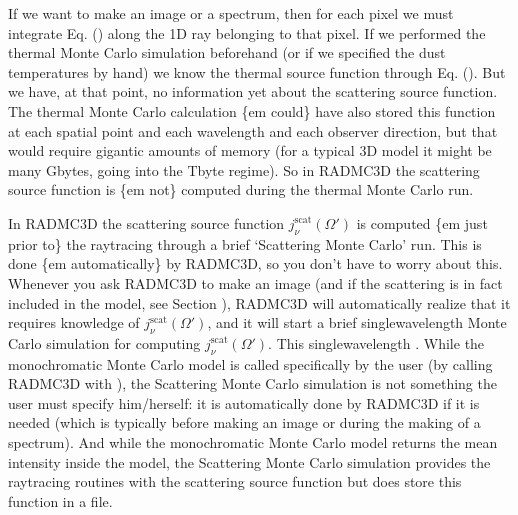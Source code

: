 \documentclass[letterpaper,10pt,english]{sphinxmanual}
\begin{document}
If we want to make an image or a spectrum, then for each pixel we must integrate
Eq. () along the 1\sphinxhyphen{}D ray belonging to that pixel. If we
performed the thermal Monte Carlo simulation beforehand (or if we specified the
dust temperatures by hand) we know the thermal source function through
Eq. (). But we have, at that point, no
information yet about the scattering source function. The thermal Monte Carlo
calculation \{em could\} have also stored this function at each spatial point and
each wavelength and each observer direction, but that would require gigantic
amounts of memory (for a typical 3\sphinxhyphen{}D model it might be many Gbytes, going into
the Tbyte regime). So in RADMC\sphinxhyphen{}3D the scattering source function is \{em not\}
computed during the thermal Monte Carlo run.

In RADMC\sphinxhyphen{}3D the scattering source function \(j_\nu^{\mathrm{scat}}(\Omega')\)
is computed \{em just prior to\} the ray\sphinxhyphen{}tracing through a brief ‘Scattering
Monte Carlo’ run. This is done \{em automatically\} by RADMC\sphinxhyphen{}3D, so you
don’t have to worry about this. Whenever you ask RADMC\sphinxhyphen{}3D to make an image
(and if the scattering is in fact included in the model, see Section
{\hyperref[\detokenize{dustradtrans:sec-modes-of-scattering}]{}}), RADMC\sphinxhyphen{}3D will automatically realize that it
requires knowledge of \(j_\nu^{\mathrm{scat}}(\Omega')\), and it will start a
brief single\sphinxhyphen{}wavelength Monte Carlo simulation for computing
\(j_\nu^{\mathrm{scat}}(\Omega')\). This single\sphinxhyphen{}wavelength . While the monochromatic Monte
Carlo model is called specifically by the user (by calling RADMC\sphinxhyphen{}3D with
), the Scattering Monte Carlo simulation is not
something the user must specify him/her\sphinxhyphen{}self: it is automatically done by
RADMC\sphinxhyphen{}3D if it is needed (which is typically before making an image or
during the making of a spectrum). And while the monochromatic Monte Carlo
model returns the mean intensity inside the model, the Scattering Monte Carlo
simulation provides the raytracing routines with the scattering source
function but does  store this function in a file.
\end{document}

